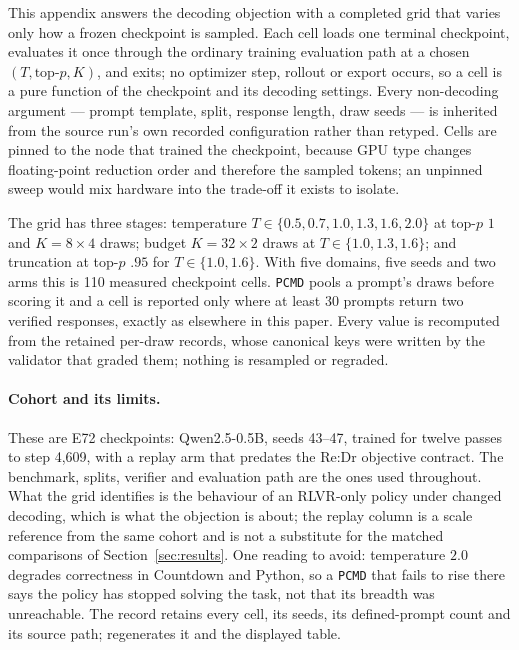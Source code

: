 \documentclass{article}
\newcommand{\1}{\mathbf 1}
\newcommand{\pmd}{\texttt{PCMD}}
\theoremstyle{remark}
\theoremstyle{definition}
\theoremstyle{plain}
\begin{document}
This appendix answers the decoding objection with a completed
grid that varies only how a frozen checkpoint is sampled. Each cell loads one
terminal checkpoint, evaluates it once through the ordinary training evaluation
path at a chosen $(T,\text{top-}p,K)$, and exits; no optimizer step, rollout or
export occurs, so a cell is a pure function of the checkpoint and its decoding
settings. Every non-decoding argument --- prompt template, split, response
length, draw seeds --- is inherited from the source run's own recorded
configuration rather than retyped. Cells are pinned to the node that trained
the checkpoint, because GPU type changes floating-point reduction order and
therefore the sampled tokens; an unpinned sweep would mix hardware into the
trade-off it exists to isolate.

The grid has three stages: temperature $T\in\{0.5,0.7,1.0,1.3,1.6,2.0\}$ at
top-$p$ $1$ and $K=8\times4$ draws; budget $K=32\times2$ draws at
$T\in\{1.0,1.3,1.6\}$; and truncation at top-$p$ $.95$ for $T\in\{1.0,1.6\}$.
With five domains, five seeds and two arms this is 110 measured checkpoint
cells. \pmd{} pools a prompt's draws before scoring it and a cell is reported
only where at least 30 prompts return two verified responses, exactly as
elsewhere in this paper. Every value is recomputed from the retained per-draw
records, whose canonical keys were written by the validator that graded them;
nothing is resampled or regraded.

\paragraph{Cohort and its limits.}
These are E72 checkpoints: Qwen2.5-0.5B, seeds 43--47, trained for twelve
passes to step 4,609, with a replay arm that predates the Re:Dr objective
contract. The benchmark, splits, verifier and evaluation path are the ones used
throughout. What the grid identifies is the behaviour of an RLVR-only
policy under changed decoding, which is what the objection is about; the
replay column is a scale reference from the same cohort and is not a substitute
for the matched comparisons of Section~\ref{sec:results}. One reading to avoid:
temperature $2.0$ degrades correctness in Countdown and Python, so a \pmd{}
that fails to rise there says the policy has stopped solving the task, not that
its breadth was unreachable. The record
 retains every cell, its seeds,
its defined-prompt count and its source path;
 regenerates it and the displayed
table.
\end{document}
